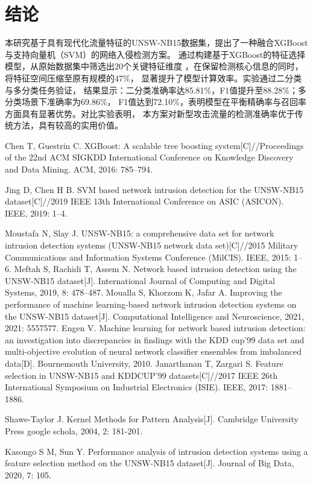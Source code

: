\documentclass{article}
\begin{document}
\section{结论}
本研究基于具有现代化流量特征的UNSW-NB15数据集，提出了一种融合XGBoost与支持向量机（SVM）的网络入侵检测方案。
通过构建基于XGBoost的特征选择模型，从原始数据集中筛选出20个关键特征维度
，在保留检测核心信息的同时，将特征空间压缩至原有规模的47\%，
显著提升了模型计算效率。实验通过二分类与多分类任务验证，
结果显示：二分类准确率达85.81\%，F1值提升至88.28\%；多分类场景下准确率为69.86\%，
F1值达到72.10\%，表明模型在平衡精确率与召回率方面具有显著优势。对比实验表明，
本方案对新型攻击流量的检测准确率优于传统方法，具有较高的实用价值。
\begin{thebibliography}{10}
  Chen T, Guestrin C. XGBoost: A scalable tree boosting system[C]//Proceedings of the 22nd ACM SIGKDD International Conference on Knowledge Discovery and Data Mining. ACM, 2016: 785–794.

  Jing D, Chen H B. SVM based network intrusion detection for the UNSW-NB15 dataset[C]//2019 IEEE 13th International Conference on ASIC (ASICON). IEEE, 2019: 1–4.

  Moustafa N, Slay J. UNSW-NB15: a comprehensive data set for network intrusion detection systems (UNSW-NB15 network data set)[C]//2015 Military Communications and Information Systems Conference (MilCIS). IEEE, 2015: 1–6.
  Meftah S, Rachidi T, Assem N. Network based intrusion detection using the UNSW-NB15 dataset[J]. International Journal of Computing and Digital Systems, 2019, 8: 478–487.
  Moualla S, Khorzom K, Jafar A. Improving the performance of machine learning-based network intrusion detection systems on the UNSW-NB15 dataset[J]. Computational Intelligence and Neuroscience, 2021, 2021: 5557577.
  Engen V. Machine learning for network based intrusion detection: an investigation into discrepancies in findings with the KDD cup'99 data set and multi-objective evolution of neural network classifier ensembles from imbalanced data[D]. Bournemouth University, 2010.
  Janarthanan T, Zargari S. Feature selection in UNSW-NB15 and KDDCUP'99 datasets[C]//2017 IEEE 26th International Symposium on Industrial Electronics (ISIE). IEEE, 2017: 1881–1886.
   
  Shawe-Taylor J. Kernel Methods for Pattern Analysis[J]. Cambridge University Press google schola, 2004, 2: 181-201.

  

  Kasongo S M, Sun Y. Performance analysis of intrusion detection systems using a feature selection method on the UNSW-NB15 dataset[J]. Journal of Big Data, 2020, 7: 105.
  



\end{thebibliography}

\end{document}
